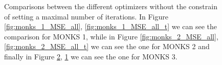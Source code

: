 \begin{figure}[t!]{}
\begin{subfigure}{0.45\textwidth}
                \end{subfigure}
                \begin{subfigure}{0.45\textwidth}
                    \caption{}
                    \label{fig:monks_3_MSE_all_t}
                \end{subfigure}
                \begin{subfigure}{0.45\textwidth}
                    \caption{}
                    \label{fig:monks_3_MSE_all}
                \end{subfigure}
                \caption{Comparisons between the different optimizers without the constrain of setting a maximal
                number of iterations. In Figure \ref{fig:monks_1_MSE_all}, \ref{fig:monks_1_MSE_all_t} we can see the
                comparison for MONKS 1, while in Figure \ref{fig:monks_2_MSE_all}, \ref{fig:monks_2_MSE_all_t} we can see the one for
                MONKS 2 and finally in Figure \ref{fig:monks_3_MSE_all},  \ref{fig:monks_3_MSE_all_t} we can see the one for MONKS 3.}
                \label{fig:monks_MSE_all}
            \end{figure}

